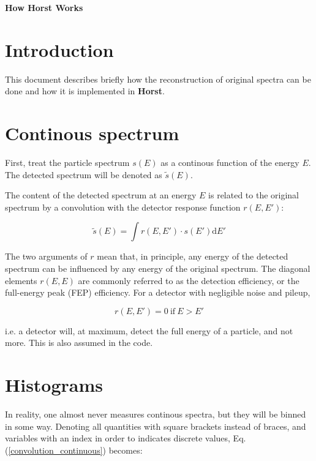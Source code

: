 \documentclass{article}
\begin{document}
\begin{titlepage}
\Huge
	\textbf{How Horst Works}
\end{titlepage}

\tableofcontents

\newpage

\section{Introduction}
This document describes briefly how the reconstruction of original spectra can be done and how it is implemented in \textbf{Horst}.

\section{Continous spectrum}
First, treat the particle spectrum $s(E)$ as a continous function of the energy $E$. 
The detected spectrum will be denoted as $\tilde{s}(E)$.

The content of the detected spectrum at an energy $E$ is related to the original spectrum by a convolution with the detector response function $r(E, E')$:

\begin{equation}
\label{convolution_continuous}
	\tilde{s}(E) = \int r(E, E') \cdot s(E') \mathrm{d}E' 
\end{equation}

The two arguments of $r$ mean that, in principle, any energy of the detected spectrum can be influenced by any energy of the original spectrum.
The diagonal elements $r(E,E)$ are commonly referred to as the detection efficiency, or the full-energy peak (FEP) efficiency.
For a detector with negligible noise and pileup, 

\begin{equation}
	\label{response_condition}
	r(E, E') = 0 ~\mathrm{if}~ E > E'
\end{equation}

i.e. a detector will, at maximum, detect the full energy of a particle, and not more. This is also assumed in the code.

\section{Histograms}
In reality, one almost never measures continous spectra, but they will be binned in some way.
Denoting all quantities with square brackets instead of braces, and variables with an index in order to indicates discrete values, Eq. (\ref{convolution_continuous}) becomes:
\end{document}
